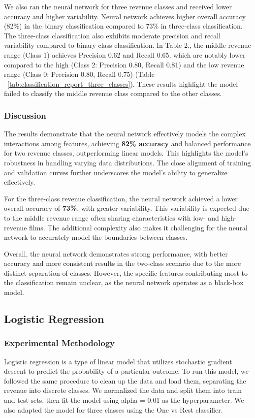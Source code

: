 \documentclass{article}
\begin{document}
We also ran the neural network for three revenue classes and received lower accuracy and higher variability. Neural network achieves higher overall accuracy (82\%) in the binary classification compared to 73\% in three-class classification. The three-class classification also exhibits moderate precision and recall variability compared to binary class classification. In Table 2., the middle revenue range (Class 1) achieves Precision 0.62 and Recall 0.65, which are notably lower compared to the high (Class 2: Precision 0.80, Recall 0.81) and the low revenue range (Class 0: Precision 0.80, Recall 0.75) (Table ~\ref{tab:classification_report_three_classes}). These results highlight the model failed to classify the middle revenue class compared to the other classes.

\subsubsection{Discussion}

The results demonstrate that the neural network effectively models the complex interactions among features, achieving \textbf{82\% accuracy} and balanced performance for two revenue classes, outperforming linear models. This highlights the model’s robustness in handling varying data distributions. The close alignment of training and validation curves further underscores the model's ability to generalize effectively.

For the three-class revenue classification, the neural network achieved a lower overall accuracy of \textbf{73\%}, with greater variability. This variability is expected due to the middle revenue range often sharing characteristics with low- and high-revenue films. The additional complexity also makes it challenging for the neural network to accurately model the boundaries between classes.

Overall, the neural network demonstrates strong performance, with better accuracy and more consistent results in the two-class scenario due to the more distinct separation of classes. However, the specific features contributing most to the classification remain unclear, as the neural network operates as a black-box model.

\subsection{Logistic Regression}
\subsubsection{Experimental Methodology}
Logistic regression is a type of linear model that utilizes stochastic gradient descent to predict the probability of a particular outcome. To run this model, we followed the same procedure to clean up the data and load them, separating the revenue into discrete classes. We normalized the data and split them into train and test sets, then fit the model using alpha = 0.01 as the hyperparameter. We also adapted the model for three classes using the One vs Rest classifier. 
\end{document}
